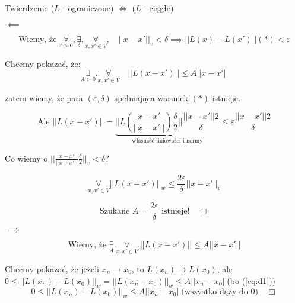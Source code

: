 \documentclass[../main.tex]{subfiles}
\begin{document}
\begin{tw}
    Twierdzenie ($L$ - ograniczone) $\iff$ ($L$ - ciągłe)
\end{tw}

\begin{dowod}
    $\impliedby$
\end{dowod}

$$\text{Wiemy, że }\underset{\varepsilon > 0}{\forall}, \underset{\delta}{\exists}, \underset{x,x'\in V}{\forall},\quad ||x-x'||_v < \delta \implies ||L(x) - L(x')||(*)< \varepsilon$$

Chcemy pokazać, że:
$$\underset{A>0}{\exists}.\underset{x,x'\in V}{\forall}\quad ||L(x-x')|| \leq A||x-x'||$$

zatem wiemy, że para $(\varepsilon, \delta)$ spełniająca warunek $(*)$ istnieje.

$$\text{Ale } ||L(x-x')|| = \underbrace{\Bigg |\Bigg |L\left ( \frac{x-x'}{||x-x'||}\right ) \frac{\delta}{2}\Bigg |\Bigg | \frac{||x-x'|| 2}{\delta}}_{\text{własność liniowości i normy}} \leq \varepsilon \frac{||x-x'|| 2}{\delta}$$

Co wiemy o $\Big | \Big | \frac{x-x'}{||x-x'||} \frac{\delta}{2} \Big | \Big |_v < \delta?$

$$\underset{x,x'\in V}{\forall}||L(x-x')||_w \leq \frac{2 \varepsilon}{\delta} ||x-x'||_v$$

$$\text{Szukane }A=\frac{2\varepsilon}{\delta}\text{ istnieje!}\quad \Box$$

\begin{large}
    $\implies$
\end{large}

\begin{equation}\label{eq:d1}
    \text{Wiemy, że }\underset{A}{\exists}. \underset{x,x'\in V}{\forall}.||L(x-x')|| \leq A||x-x'||
\end{equation}

Chcemy pokazać, że jeżeli $x_n\to x_0$, to $L(x_n)\to L(x_0)$, ale $0 \leq ||L(x_n)-L(x_0)||_w = ||L(x_n-x_0)||_w \leq A||x_n-x_0||$(bo (\ref{eq:d1}))
$$0\leq ||L(x_n) - L(x_0)||_w \leq A||x_n - x_0||(\text{wszystko dąży do 0)}\quad \Box$$
\end{document}
